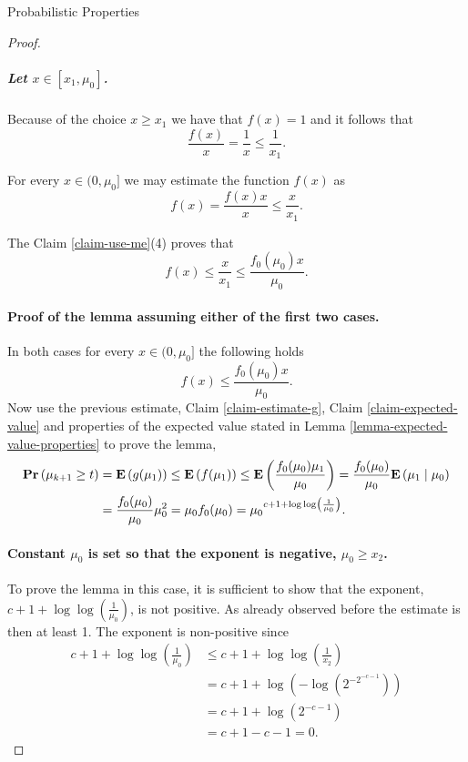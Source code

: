 \begin{section}{Probabilistic Properties}
\begin{proof}
\subparagraph{Let $x \in [x_1, \mu_0]$.} Because of the choice $x \geq x_1$ we have that $f(x) = 1$ and it follows that 
\[ 
	\frac{f(x)}{x} = \frac{1}{x} \leq \frac{1}{x_1} \text{.}
\]

For every $x \in (0, \mu_0]$ we may estimate the function $f(x)$ as \[f(x) = \frac{f(x)x}{x} \leq \frac{x}{x_1} \text{.} \]

The Claim \ref{claim-use-me}(4) proves that
\[
	f(x) \leq \frac{x}{x_1} \leq \frac{f_0(\mu_0)x}{\mu_0} \text{.}
\]

\paragraph{Proof of the lemma assuming either of the first two cases.}
In both cases for every $x \in (0, \mu_0]$ the following holds \[ f(x) \leq \frac{f_0(\mu_0)x}{\mu_0} \text{.} \] Now use the previous estimate, Claim \ref{claim-estimate-g}, Claim \ref{claim-expected-value} and properties of the expected value stated in Lemma \ref{lemma-expected-value-properties} to prove the lemma,
\[
\begin{split}
\mathbf{Pr}\left(\mu_{k + 1} \geq t\right)
	& = \mathbf{E}\left(g(\mu_1)\right) \leq \mathbf{E}\left(f(\mu_1)\right) \leq \mathbf{E}\left(\frac{f_0(\mu_0)\mu_1}{\mu_0}\right) = \frac{f_0(\mu_0)}{\mu_0}\mathbf{E}\left(\mu_1 \mid \mu_0\right) \\
	& = \frac{f_0(\mu_0)}{\mu_0}\mu_0 ^ 2 = \mu_0 f_0(\mu_0) = {\mu_0}^{c + 1 + \log \log \left(\frac{1}{\mu_0}\right)} \text{.}
\end{split}
\]

\paragraph{Constant $\mu_0$ is set so that the exponent is negative, $\mu_0 \geq x_2$.}
To prove the lemma in this case, it is sufficient to show that the exponent, $c + 1 + \log \log \left( \frac{1}{\mu_0} \right)$, is not positive. As already observed before the estimate is then at least 1. The exponent is non-positive since
\[
\begin{split}
	c + 1 + \log \log \left( \frac{1}{\mu_0} \right) 
		& \leq c + 1 + \log \log \left( \frac{1}{x_2} \right) \\ 
		& = c + 1 + \log \left(- \log \left(2 ^ {-2 ^ {-c - 1}}\right)\right) \\ 
		& = c + 1 + \log \left(2 ^ {-c - 1}\right) \\ 
		& = c + 1 - c - 1 = 0 \text{.}
\end{split}
\]


\end{proof}
\end{section}
